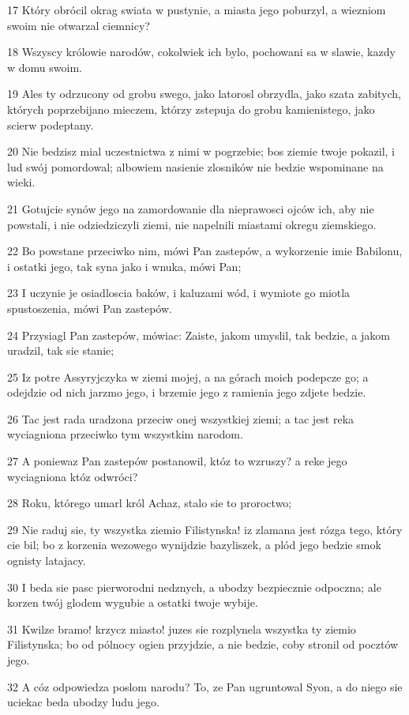 \par 17 Który obrócil okrag swiata w pustynie, a miasta jego poburzyl, a wiezniom swoim nie otwarzal ciemnicy?
\par 18 Wszyscy królowie narodów, cokolwiek ich bylo, pochowani sa w slawie, kazdy w domu swoim.
\par 19 Ales ty odrzucony od grobu swego, jako latorosl obrzydla, jako szata zabitych, których poprzebijano mieczem, którzy zstepuja do grobu kamienistego, jako scierw podeptany.
\par 20 Nie bedzisz mial uczestnictwa z nimi w pogrzebie; bos ziemie twoje pokazil, i lud swój pomordowal; albowiem nasienie zlosników nie bedzie wspominane na wieki.
\par 21 Gotujcie synów jego na zamordowanie dla nieprawosci ojców ich, aby nie powstali, i nie odziedziczyli ziemi, nie napelnili miastami okregu ziemskiego.
\par 22 Bo powstane przeciwko nim, mówi Pan zastepów, a wykorzenie imie Babilonu, i ostatki jego, tak syna jako i wnuka, mówi Pan;
\par 23 I uczynie je osiadloscia baków, i kaluzami wód, i wymiote go miotla spustoszenia, mówi Pan zastepów.
\par 24 Przysiagl Pan zastepów, mówiac: Zaiste, jakom umyslil, tak bedzie, a jakom uradzil, tak sie stanie;
\par 25 Iz potre Assyryjczyka w ziemi mojej, a na górach moich podepcze go; a odejdzie od nich jarzmo jego, i brzemie jego z ramienia jego zdjete bedzie.
\par 26 Tac jest rada uradzona przeciw onej wszystkiej ziemi; a tac jest reka wyciagniona przeciwko tym wszystkim narodom.
\par 27 A poniewaz Pan zastepów postanowil, któz to wzruszy? a reke jego wyciagniona któz odwróci?
\par 28 Roku, którego umarl król Achaz, stalo sie to proroctwo;
\par 29 Nie raduj sie, ty wszystka ziemio Filistynska! iz zlamana jest rózga tego, który cie bil; bo z korzenia wezowego wynijdzie bazyliszek, a plód jego bedzie smok ognisty latajacy.
\par 30 I beda sie pasc pierworodni nedznych, a ubodzy bezpiecznie odpoczna; ale korzen twój glodem wygubie a ostatki twoje wybije.
\par 31 Kwilze bramo! krzycz miasto! juzes sie rozplynela wszystka ty ziemio Filistynska; bo od pólnocy ogien przyjdzie, a nie bedzie, coby stronil od pocztów jego.
\par 32 A cóz odpowiedza poslom narodu? To, ze Pan ugruntowal Syon, a do niego sie uciekac beda ubodzy ludu jego.

